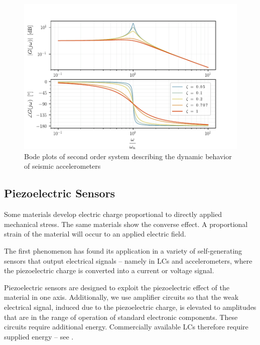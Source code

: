 \begin{figure}[!htb]
  \centering
  \includegraphics[scale=0.8]{figures/measurement/accel/seismic_accelerometer_edited}
  \caption[Second-Order System Bode plots]{Bode plots of second order system describing the dynamic behavior of seismic accelerometers%
    \label{fig:seismic_accelerometer_edited}}
\end{figure}

\subsection{Piezoelectric Sensors}
Some materials develop electric charge proportional to directly applied mechanical stress. The same materials show the converse effect. A proportional strain of the material will occur to an applied electric field.

The first phenomenon has found its application in a variety of self-generating sensors that output electrical signals -- namely in \ac{LC}s and accelerometers, where the piezoelectric charge is converted into a current or voltage signal.

Piezoelectric sensors are designed to exploit the piezoelectric effect of the material in one axis. Additionally, we use amplifier circuits so that the weak electrical signal, induced due to the piezoelectric charge, is elevated to amplitudes that are in the range of operation of standard electronic components. These circuits require additional energy. Commercially available \ac{LC}s therefore require supplied energy -- see .

